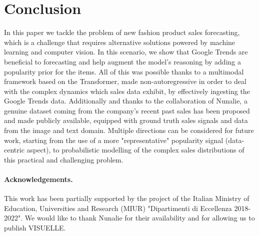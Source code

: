 \documentclass{article}
\newcommand{\datasetname}[0] {VISUELLE}
\begin{document}
\section{Conclusion}\label{sec:conclusion}
In this paper we tackle the problem of new fashion product sales forecasting, which is a challenge that requires alternative solutions powered by machine learning and computer vision. In this scenario, we show that Google Trends are beneficial to forecasting and help augment the model's reasoning by adding a popularity prior for the items. All of this was possible thanks to a multimodal framework based on the Transformer, made non-autoregressive in order to deal with the complex dynamics which sales data exhibit, by effectively ingesting the Google Trends data. Additionally and thanks to the collaboration of Nunalie, a genuine dataset coming from the company's recent past sales has been proposed and made publicly available, equipped with ground truth sales signals and data from the image and text domain. Multiple directions can be considered for future work, starting from the use of a more "representative" popularity signal (data-centric aspect), to probabilistic modelling of the complex sales distributions of this practical and challenging problem. 

\paragraph{Acknowledgements.} This work has been partially supported by the project of the Italian Ministry of Education, Universities and Research (MIUR) "Dipartimenti di Eccellenza 2018-2022". We would like to thank Nunalie for their availability and for allowing us to publish \datasetname. 

\clearpage 



\end{document}
